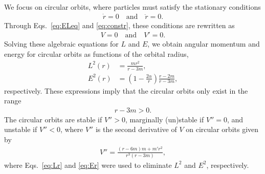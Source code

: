 \documentclass[aps,11pt,nofootinbib,preprintnumbers,groupedaddress,superscriptaddress]{revtex4-2}
\begin{document}
We focus on circular orbits, where particles must satisfy the stationary conditions
\begin{align}
\dot{r}=0 \quad \mathrm{and} \quad \ddot{r}=0. 
\end{align}
Through Eqs.~\eqref{eq:ELeq} and \eqref{eq:constr}, these conditions are rewritten as
\begin{align}
V=0 \quad \mathrm{and} \quad V'=0. 
\end{align}
Solving these algebraic
equations for $L$ and $E$, we obtain angular momentum and energy for circular orbits as functions of the orbital radius,
\begin{align}
\label{eq:Lr}
L^2(r)&=\frac{mr^2}{r-3m},
\\
\label{eq:Er}
E^2(r)&=\left(1-\frac{2\alpha}{r}\right) \frac{r-2m}{r-3m},
\end{align}
respectively. These expressions imply that the circular orbits only exist 
in the range
\begin{align}
r-3m>0.
\end{align}
The circular orbits are stable if $V''>0$, marginally (un)stable if $V''=0$, and unstable if $V''<0$, where $V''$ is the second derivative of $V$ on circular orbits given by
\begin{align}
V''
=\frac{(r-6m)m+m' r^2}{r^3(r-3m)},
\end{align}
where Eqs.~\eqref{eq:Lr} and \eqref{eq:Er} were used to eliminate $L^2$ and $E^2$, respectively.
\end{document}
